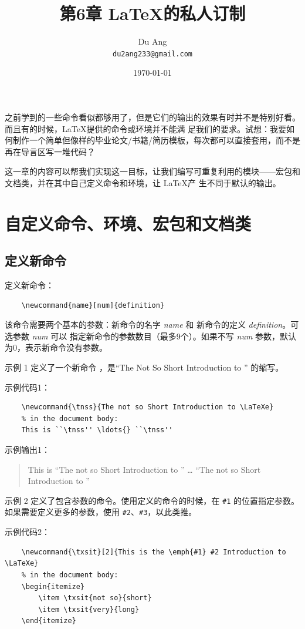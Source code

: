 \documentclass[UTF8]{ctexart}
\title{\heiti 第6章 \quad \LaTeX 的私人订制}
\author{\kaishu Du Ang \\ \texttt{du2ang233@gmail.com} }
\date{\today}
\begin{document}
\maketitle

\tableofcontents

\newpage

之前学到的一些命令看似都够用了，但是它们的输出的效果有时并不是特别好看。而且有的时候，\LaTeX 提供的命令或环境并不能满
足我们的要求。试想：我要如何制作一个简单但像样的毕业论文/书籍/简历模板，每次都可以直接套用，而不是再在导言区写一堆代码？

这一章的内容可以帮我们实现这一目标，让我们编写可重复利用的模块——宏包和文档类，并在其中自己定义命令和环境，让 \LaTeX 产
生不同于默认的输出。

\section{自定义命令、环境、宏包和文档类}
\subsection{定义新命令}
定义新命令：
\begin{verbatim}
    \newcommand{name}[num]{definition}
\end{verbatim}

该命令需要两个基本的参数：新命令的名字 \emph{name} 和 新命令的定义 \emph{definition}。可选参数 \emph{num} 可以
指定新命令的参数数目（最多9个）。如果不写 \emph{num} 参数，默认为0，表示新命令没有参数。

示例 1 定义了一个新命令 \texttt{\tnss}，是“The Not So Short Introduction to \LaTeXe” 的缩写。

示例代码1：
\begin{verbatim}
    \newcommand{\tnss}{The not so Short Introduction to \LaTeXe}
    % in the document body:
    This is ``\tnss'' \ldots{} ``\tnss''
\end{verbatim}

示例输出1：
\begin{quote}
    \newcommand{\tnss}{The not so Short Introduction to \LaTeXe}
    This is ``\tnss'' \ldots{} ``\tnss''
\end{quote}

示例 2 定义了包含参数的命令。使用定义的命令的时候，在 \texttt{\#1} 的位置指定参数。如果需要定义更多的参数，使用
\texttt{\#2}、\texttt{\#3}，以此类推。

示例代码2：
\begin{verbatim}
    \newcommand{\txsit}[2]{This is the \emph{#1} #2 Introduction to \LaTeXe}
    % in the document body:
    \begin{itemize}
        \item \txsit{not so}{short}
        \item \txsit{very}{long}
    \end{itemize}
\end{verbatim}
\end{document}
